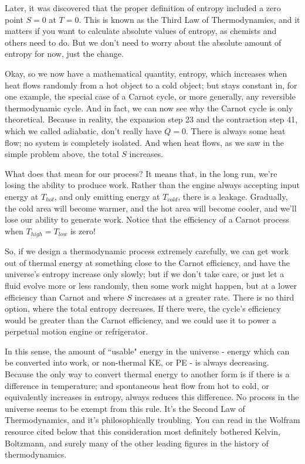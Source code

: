 \documentclass[12pt]{article}
\begin{document}
Later, it was discovered that the proper definition of entropy included a zero point $S=0$ at $T=0$. This is known as the Third Law of Thermodynamics, and it matters if you want to calculate absolute values of entropy, as chemists and others need to do. But we don't need to worry about the absolute amount of entropy for now, just the change.

Okay, so we now have a mathematical quantity, entropy, which increases when heat flows randomly from a hot object to a cold object; but stays constant in, for one example, the special case of a Carnot cycle, or more generally, any reversible thermodynamic cycle. And in fact, we can now see why the Carnot cycle is only theoretical. Because in reality, the expansion step 23 and the contraction step 41, which we called adiabatic, don't really have $Q=0$. There is always some heat flow; no system is completely isolated. And when heat flows, as we saw in the simple problem above, the total $S$ increases. 

What does that mean for our process? It means that, in the long run, we're losing the ability to produce work. Rather than the engine always accepting input energy at $T_{hot}$, and only emitting energy at $T_{cold}$, there is a leakage. Gradually, the cold area will become warmer, and the hot area will become cooler, and we'll lose our ability to generate work. Notice that the efficiency of a Carnot process when $T_{high}=T_{low}$ is zero!

So, if we design a thermodynamic process extremely carefully, we can get work out of thermal energy at something close to the Carnot efficiency, and have the universe's entropy increase only slowly; but if we don't take care, or just let a fluid evolve more or less randomly, then some work might happen, but at a lower efficiency than Carnot and where $S$ increases at a greater rate. There is no third option, where the total entropy decreases. If there were, the cycle's efficiency would be greater than the Carnot efficiency, and we could use it to power a perpetual motion engine or refrigerator.


In this sense, the amount of ``usable" energy in the universe - energy which can be converted into work, or non-thermal KE, or PE - is always decreasing. Because the only way to convert thermal energy to another form is if there is a difference in temperature; and spontaneous heat flow from hot to cold, or equivalently increases in entropy, always reduces this difference. No process in the universe seems to be exempt from this rule. It's the Second Law of Thermodynamics, and it's philosophically troubling. You can read in the Wolfram resource cited below that this consideration most definitely bothered Kelvin, Boltzmann, and surely many of the other leading figures in the history of thermodynamics.
\end{document}
